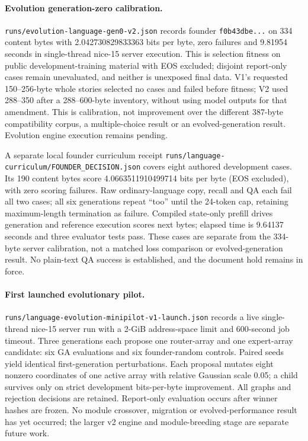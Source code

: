 \documentclass[11pt]{article}
\begin{document}
\paragraph{Evolution generation-zero calibration.}
\texttt{runs/evolution-language-gen0-v2.json} records founder
\texttt{f0b43dbe...} on 334 content bytes with 2.042730829833363 bits per byte,
zero failures and 9.81954 seconds in single-thread nice-15 server execution.
This is selection fitness on public development-training material with EOS
excluded; disjoint report-only cases remain unevaluated, and neither is
unexposed final data. V1's requested 150--256-byte whole stories selected
no cases and failed before fitness; V2 used 288--350 after a 288--600-byte
inventory, without using model outputs for that amendment. This is calibration,
not improvement over the different 387-byte compatibility corpus, a
multiple-choice result or an evolved-generation result. Evolution engine
execution remains pending.

A separate local founder curriculum receipt
\texttt{runs/language-curriculum/FOUNDER\_DECISION.json} covers eight authored
development cases. Its 190 content bytes score 4.0663511910499714 bits per byte
(EOS excluded), with zero scoring failures. Raw ordinary-language copy, recall
and QA each fail all two cases; all six generations repeat ``too'' until the
24-token cap, retaining maximum-length termination as failure. Compiled
state-only prefill drives generation and reference execution scores next bytes;
elapsed time is 9.64137 seconds and three evaluator tests pass. These cases
are separate from the 334-byte server calibration, not a matched loss comparison
or evolved-generation result. No plain-text QA success is established, and the
document hold remains in force.

\paragraph{First launched evolutionary pilot.}
\texttt{runs/language-evolution-minipilot-v1-launch.json} records a live
single-thread nice-15 server run with a 2-GiB address-space limit and 600-second
job timeout. Three generations each propose one router-array and one
expert-array candidate: six GA evaluations and six founder-random controls.
Paired seeds yield identical first-generation perturbations. Each proposal
mutates eight nonzero coordinates of one active array with relative Gaussian
scale 0.05; a child survives only on strict development bits-per-byte
improvement. All graphs and rejection decisions are retained. Report-only
evaluation occurs after winner hashes are frozen. No module crossover,
migration or evolved-performance result has yet occurred; the larger v2 engine
and module-breeding stage are separate future work.
\end{document}
